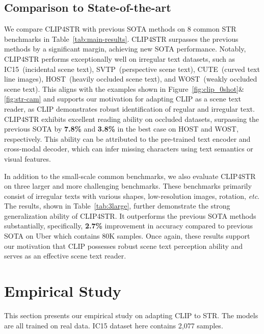 \documentclass[lettersize,journal]{IEEEtran}
\def\etc{\emph{etc}}
\begin{document}
\subsection{Comparison to State-of-the-art}
We compare CLIP4STR with previous SOTA methods on 8 common STR benchmarks in Table~\ref{tab:main-results}.
CLIP4STR surpasses the previous methods by a significant margin, achieving new SOTA performance.
Notably, CLIP4STR performs exceptionally well on irregular text datasets, such as IC15~(incidental scene text), SVTP~(perspective scene text), CUTE~(curved text line images), HOST~(heavily occluded scene text), and WOST~(weakly occluded scene text). 
This aligns with the examples shown in Figure~\ref{fig:clip_0shot}\&\ref{fig:str-cam} and supports our motivation for adapting CLIP as a scene text reader, as CLIP demonstrates robust identification of regular and irregular text.
CLIP4STR exhibits excellent reading ability on occluded datasets, surpassing the previous SOTA by \textbf{7.8\%} and \textbf{3.8\%} in the best case on HOST and WOST, respectively.
This ability can be attributed to the pre-trained text encoder and cross-modal decoder, which can infer missing characters using text semantics or visual features.

In addition to the small-scale common benchmarks, we also evaluate CLIP4STR on three larger and more challenging benchmarks.
These benchmarks primarily consist of irregular texts with various shapes, low-resolution images, rotation, \etc.
The results, shown in Table~\ref{tab:3large}, further demonstrate the strong generalization ability of CLIP4STR.
It outperforms the previous SOTA methods substantially, specifically, \textbf{2.7\%} improvement in accuracy compared to previous SOTA on Uber which contains 80K samples.
Once again, these results support our motivation that CLIP possesses robust scene text perception ability and serves as an effective scene text reader.



\section{Empirical Study}
This section presents our empirical study on adapting CLIP to STR. The models are all trained on real data. IC15 dataset here contains 2,077 samples.
\end{document}
